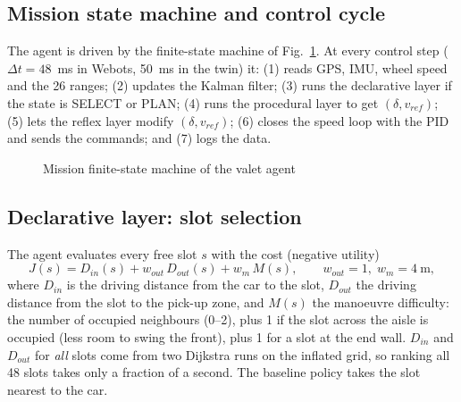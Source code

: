 \documentclass[12pt,a4paper]{article}
\begin{document}
\subsection{Mission state machine and control cycle}
The agent is driven by the finite-state machine of Fig.~\ref{fig:fsm}. At every control step ($\Delta t = 48$~ms in Webots, 50~ms in the twin) it: (1) reads GPS, IMU, wheel speed and the 26 ranges; (2) updates the Kalman filter; (3) runs the declarative layer if the state is SELECT or PLAN; (4) runs the procedural layer to get $(\delta, v_{ref})$; (5) lets the reflex layer modify $(\delta, v_{ref})$; (6) closes the speed loop with the PID and sends the commands; and (7) logs the data.

\begin{figure}[!htbp]
\centering
{}
\caption{Mission finite-state machine of the valet agent}
\label{fig:fsm}
\end{figure}

\subsection{Declarative layer: slot selection}
The agent evaluates every free slot $s$ with the cost (negative utility)
\begin{equation}
J(s) = D_{in}(s) + w_{out}\,D_{out}(s) + w_{m}\,M(s), \qquad w_{out} = 1,\; w_m = 4~\text{m},
\label{eq:utility}
\end{equation}
where $D_{in}$ is the driving distance from the car to the slot, $D_{out}$ the driving distance from the slot to the pick-up zone, and $M(s)$ the manoeuvre difficulty: the number of occupied neighbours (0--2), plus 1 if the slot across the aisle is occupied (less room to swing the front), plus 1 for a slot at the end wall. $D_{in}$ and $D_{out}$ for \emph{all} slots come from two Dijkstra runs on the inflated grid, so ranking all 48 slots takes only a fraction of a second. The baseline policy takes the slot nearest to the car.
\end{document}
